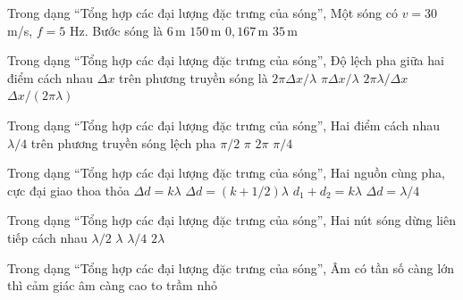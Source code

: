 \begin{ex}
Trong dạng “Tổng hợp các đại lượng đặc trưng của sóng”, Một sóng có $v=30$ m/s, $f=5$ Hz. Bước sóng là
\choice
{\True $6\,\text{m}$}
{$150\,\text{m}$}
{$0,167\,\text{m}$}
{$35\,\text{m}$}
\end{ex}

\begin{ex}
Trong dạng “Tổng hợp các đại lượng đặc trưng của sóng”, Độ lệch pha giữa hai điểm cách nhau $\Delta x$ trên phương truyền sóng là
\choice
{\True $2\pi\Delta x/\lambda$}
{$\pi\Delta x/\lambda$}
{$2\pi\lambda/\Delta x$}
{$\Delta x/(2\pi\lambda)$}
\end{ex}

\begin{ex}
Trong dạng “Tổng hợp các đại lượng đặc trưng của sóng”, Hai điểm cách nhau $\lambda/4$ trên phương truyền sóng lệch pha
\choice
{\True $\pi/2$}
{$\pi$}
{$2\pi$}
{$\pi/4$}
\end{ex}

\begin{ex}
Trong dạng “Tổng hợp các đại lượng đặc trưng của sóng”, Hai nguồn cùng pha, cực đại giao thoa thỏa
\choice
{\True $\Delta d=k\lambda$}
{$\Delta d=(k+1/2)\lambda$}
{$d_1+d_2=k\lambda$}
{$\Delta d=\lambda/4$}
\end{ex}

\begin{ex}
Trong dạng “Tổng hợp các đại lượng đặc trưng của sóng”, Hai nút sóng dừng liên tiếp cách nhau
\choice
{\True $\lambda/2$}
{$\lambda$}
{$\lambda/4$}
{$2\lambda$}
\end{ex}

\begin{ex}
Trong dạng “Tổng hợp các đại lượng đặc trưng của sóng”, Âm có tần số càng lớn thì cảm giác âm càng
\choice
{\True cao}
{to}
{trầm}
{nhỏ}
\end{ex}

